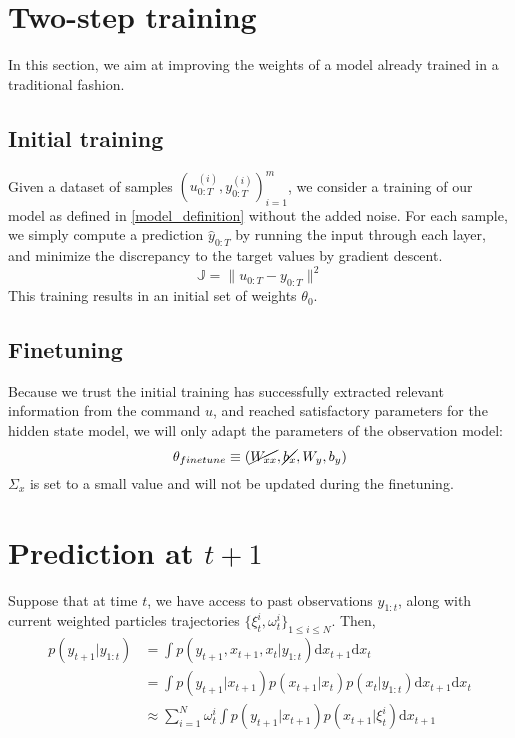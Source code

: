 \documentclass[10pt,a4paper]{report}
\begin{document}
\section{Two-step training}
In this section, we aim at improving the weights of a model already trained in a traditional fashion.

\subsection{Initial training}
\label{sec:pretrain}
Given a dataset of samples $(u_{0:T}^{(i)}, y_{0:T}^{(i)})_{i=1}^m$, we consider a training of our model as defined in \ref{model_definition} without the added noise.
For each sample, we simply compute a prediction $\hat y_{0:T}$ by running the input through each layer, and minimize the discrepancy to the target values by gradient descent.
$$
        \mathbb{J} = \| u_{0:T} - y_{0:T} \|^2
$$
This training results in an initial set of weights $\theta_0$.

\subsection{Finetuning}
Because we trust the initial training has successfully extracted relevant information from the command $u$, and reached satisfactory parameters for the hidden state model, we will only adapt the parameters of the observation model:
$$
        \theta_{finetune} \equiv (\cancel{W_{xx}}, \cancel{b_x}, W_y, b_y)
$$
$\Sigma_x$ is set to a small value and will not be updated during the finetuning.

\section{Prediction at $t+1$}
Suppose that at time $t$, we have access to past observations $y_{1:t}$, along with current weighted particles trajectories $\{\xi_t^i, \omega_t^i\}_{1 \leq i \leq N}$.
Then,
\begin{align*}
        p(y_{t+1}|y_{1:t}) & = \int p(y_{t+1}, x_{t+1}, x_t|y_{1:t})\mathrm{d}x_{t+1}\mathrm{d}x_t                        \\
                           & = \int p(y_{t+1}|x_{t+1}) p(x_{t+1}|x_t) p(x_t|y_{1:t})\mathrm{d}x_{t+1}\mathrm{d}x_t        \\
                           & \approx \sum_{i=1}^N \omega_t^i \int p(y_{t+1}|x_{t+1}) p(x_{t+1}|\xi_t^i) \mathrm{d}x_{t+1} \\
\end{align*}
\end{document}
